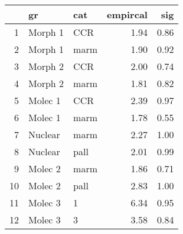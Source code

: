 \begin{table}[ht]
\centering
\begin{tabular}{rllrr}
  \hline
 & gr & cat & empircal & sig \\ 
  \hline
1 & Morph 1 & CCR & 1.94 & 0.86 \\ 
  2 & Morph 1 & marm & 1.90 & 0.92 \\ 
  3 & Morph 2 & CCR & 2.00 & 0.74 \\ 
  4 & Morph 2 & marm & 1.81 & 0.82 \\ 
  5 & Molec 1 & CCR & 2.39 & 0.97 \\ 
  6 & Molec 1 & marm & 1.78 & 0.55 \\ 
  7 & Nuclear & marm & 2.27 & 1.00 \\ 
  8 & Nuclear & pall & 2.01 & 0.99 \\ 
  9 & Molec 2 & marm & 1.86 & 0.71 \\ 
  10 & Molec 2 & pall & 2.83 & 1.00 \\ 
  11 & Molec 3 & 1 & 6.34 & 0.95 \\ 
  12 & Molec 3 & 3 & 3.58 & 0.84 \\ 
   \hline
\end{tabular}
\label{rfmiss}
\end{table}

